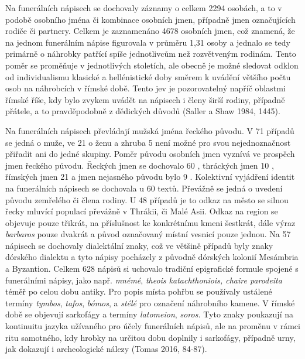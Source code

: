 Na funerálních nápisech se dochovaly záznamy o celkem 2294 osobách, a to v podobě osobního jména či kombinace osobních jmen, případně jmen označujících rodiče či partnery. Celkem je zaznamenáno 4678 osobních jmen, což znamená, že na jednom funerálním nápise figurovala v průměru 1,31 osoby a jednalo se tedy primárně o náhrobky patřící spíše jednotlivcům než rozvětveným rodinám. Tento poměr se proměňuje v jednotlivých stoletích, ale obecně je možné sledovat odklon od individualismu klasické a hellénistické doby směrem k uvádění většího počtu osob na náhrobcích v římské době. Tento jev je pozorovatelný napříč oblastmi římské říše, kdy bylo zvykem uvádět na nápisech i členy širší rodiny, případně přátele, a to pravděpodobně z dědických důvodů (Saller a Shaw 1984, 1445).

Na funerálních nápisech převládají mužská jména řeckého původu. V 71  případů se jedná o muže, ve 21  o ženu a zhruba 5  není možné pro svou nejednoznačnost přiřadit ani do jedné skupiny. Poměr původu osobních jmen vyznívá ve prospěch jmen řeckého původu. Řeckých jmen se dochovalo 60 , thráckých jmen 10 , římských jmen 21  a jmen nejasného původu bylo 9 . Kolektivní vyjádření identit na funerálních nápisech se dochovala u 60 textů. Převážně se jedná o uvedení původu zemřelého či člena rodiny. U 48 případů je to odkaz na město se silnou řecky mluvící populací převážně v Thrákii, či Malé Asii. Odkaz na region se objevuje pouze třikrát, na příslušnost ke konkrétnímu kmeni šestkrát, dále výraz {\em barbaros} pouze dvakrát a původ označovaný místní vesnicí pouze jednou. Na 57 nápisech se dochovaly dialektální znaky, což ve většině případů byly znaky dórského dialektu a tyto nápisy pocházely z původně dórských kolonií Mesámbria a Byzantion. Celkem 628 nápisů si uchovalo tradiční epigrafické formule spojené s funerálními nápisy, jako např. {\em mnémé}, {\em theois katachthoniois, chaire parodeita} téměř po celou dobu antiky. Pro popis místa pohřbu se používaly ustálené termíny {\em tymbos}, {\em tafos}, {\em bómos}, a {\em stélé} pro označení náhrobního kamene. V římské době se objevují sarkofágy a termíny {\em latomeion}, {\em soros.} Tyto znaky poukazují na kontinuitu jazyka užívaného pro účely funerálních nápisů, ale na proměnu v rámci ritu samotného, kdy hrobky na určitou dobu doplnily i sarkofágy, případně urny, jak dokazují i archeologické nálezy (Tomas 2016, 84-87).

